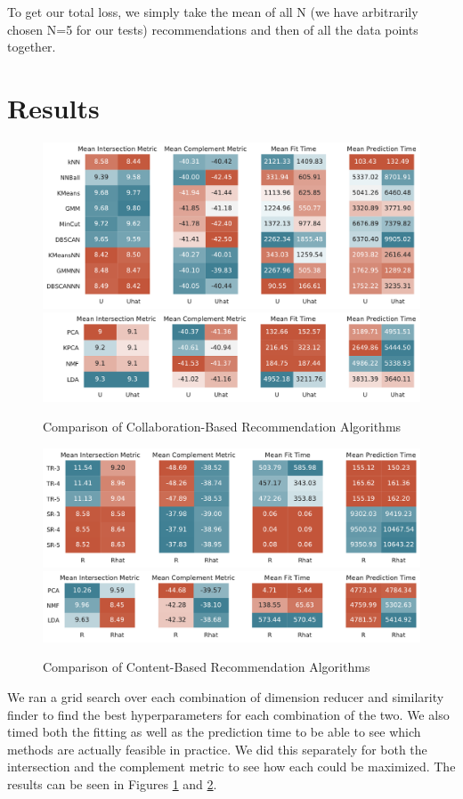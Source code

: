 \documentclass[11pt]{article}
\begin{document}
To get our total loss, we simply take the mean of all N (we have arbitrarily chosen N=5 for our tests) recommendations and then of all the data points together.


\section{Results}

\begin{figure}[t]
\centering
\includegraphics[width=1\textwidth]{figs/user_rdr.pdf}
\includegraphics[width=1\textwidth]{figs/user_dr.pdf}
\caption{Comparison of Collaboration-Based Recommendation Algorithms}
\label{fig:user_results}
\end{figure}

\begin{figure}[t]
\centering
\includegraphics[width=1\textwidth]{figs/recipe_rdr.pdf}
\includegraphics[width=1\textwidth]{figs/recipe_dr.pdf}
\caption{Comparison of Content-Based Recommendation Algorithms}
\label{fig:recipe_results}
\end{figure}
We ran a grid search over each combination of dimension reducer and similarity finder to find the best hyperparameters for each combination of the two. We also timed both the fitting as well as the prediction time to be able to see which methods are actually feasible in practice. We did this separately for both the intersection and the complement metric to see how each could be maximized. The results can be seen in Figures \ref{fig:user_results} and \ref{fig:recipe_results}.
\end{document}
